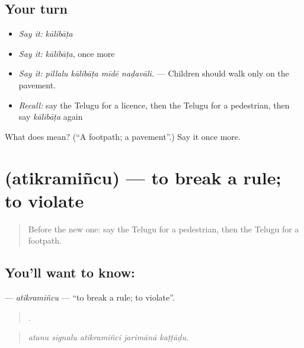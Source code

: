 \subsection*{Your turn}
\begin{itemize}
\raggedright
  \item \emph{Say it:} \emph{kālibāṭa}
  \item \emph{Say it:} \emph{kālibāṭa}, once more
  \item \emph{Say it:} \emph{pillalu kālibāṭa mīdē naḍavāli.} — Children should walk only on the pavement.
  \item \emph{Recall:} say the Telugu for a licence, then the Telugu for a pedestrian, then say \emph{kālibāṭa} again
\end{itemize}

\begin{tcolorbox}[breakable,colback=teal!4,colframe=teal!35!black,title={Before you move on}]
What does  mean? (\textquotedblleft{}A footpath; a pavement\textquotedblright{}.) Say it once more.
\end{tcolorbox}
\section[\texorpdfstring{\te{అతిక్రమించు} (atikramiñcu)}{అతిక్రమించు (atikramiñcu)}]{ (atikramiñcu) — to break a rule; to violate}

\label{lesson:TE-C447-atikramincu}



\begin{quote}
Before the new one: say the Telugu for a pedestrian, then the Telugu for a footpath.
\end{quote}

\subsection*{You'll want to know: }
\textbf{} — \emph{atikramiñcu} — \textquotedblleft{}to break a rule; to violate\textquotedblright{}.

\begin{quote}
    .
\end{quote}

\begin{quote}
\emph{atanu signalu atikramiñci jarimānā kaṭṭāḍu.}
\end{quote}

